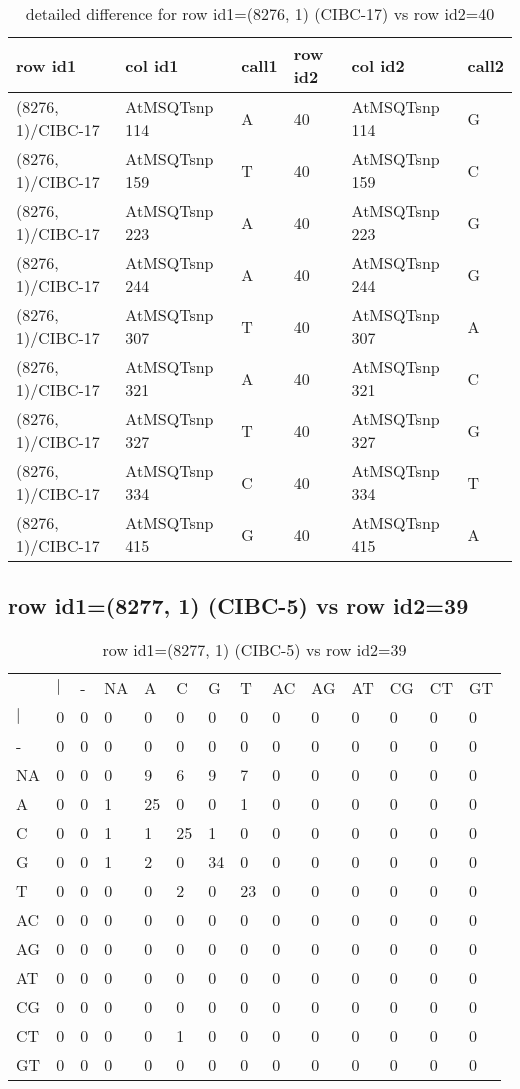\begin{center}
\begin{longtable}{|l|l|l|l|l|l|}
\caption{detailed difference for row id1=(8276, 1) (CIBC-17) vs row id2=40} \label{table_dm435}\\
\hline
row id1&col id1&call1&row id2&col id2&call2\\
\hline
(8276, 1)/CIBC-17&AtMSQTsnp 114&A&40&AtMSQTsnp 114&G\\
(8276, 1)/CIBC-17&AtMSQTsnp 159&T&40&AtMSQTsnp 159&C\\
(8276, 1)/CIBC-17&AtMSQTsnp 223&A&40&AtMSQTsnp 223&G\\
(8276, 1)/CIBC-17&AtMSQTsnp 244&A&40&AtMSQTsnp 244&G\\
(8276, 1)/CIBC-17&AtMSQTsnp 307&T&40&AtMSQTsnp 307&A\\
(8276, 1)/CIBC-17&AtMSQTsnp 321&A&40&AtMSQTsnp 321&C\\
(8276, 1)/CIBC-17&AtMSQTsnp 327&T&40&AtMSQTsnp 327&G\\
(8276, 1)/CIBC-17&AtMSQTsnp 334&C&40&AtMSQTsnp 334&T\\
(8276, 1)/CIBC-17&AtMSQTsnp 415&G&40&AtMSQTsnp 415&A\\
\hline
\end{longtable}
\end{center}

\subsection{row id1=(8277, 1) (CIBC-5) vs row id2=39}
\begin{center}
\begin{longtable}{|l|l|l|l|l|l|l|l|l|l|l|l|l|l|}
\caption{row id1=(8277, 1) (CIBC-5) vs row id2=39} \label{table_dm436}\\
\hline
\\
\hline
&$|$&-&NA&A&C&G&T&AC&AG&AT&CG&CT&GT\\
$|$&0&0&0&0&0&0&0&0&0&0&0&0&0\\
-&0&0&0&0&0&0&0&0&0&0&0&0&0\\
NA&0&0&0&9&6&9&7&0&0&0&0&0&0\\
A&0&0&1&25&0&0&1&0&0&0&0&0&0\\
C&0&0&1&1&25&1&0&0&0&0&0&0&0\\
G&0&0&1&2&0&34&0&0&0&0&0&0&0\\
T&0&0&0&0&2&0&23&0&0&0&0&0&0\\
AC&0&0&0&0&0&0&0&0&0&0&0&0&0\\
AG&0&0&0&0&0&0&0&0&0&0&0&0&0\\
AT&0&0&0&0&0&0&0&0&0&0&0&0&0\\
CG&0&0&0&0&0&0&0&0&0&0&0&0&0\\
CT&0&0&0&0&1&0&0&0&0&0&0&0&0\\
GT&0&0&0&0&0&0&0&0&0&0&0&0&0\\
\hline
\end{longtable}
\end{center}

